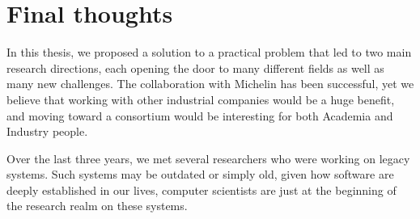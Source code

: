 \section{Final thoughts}
\label{sec:conclusion:final-thoughts}

In this thesis, we proposed a solution to a practical problem
that led to two main research directions, each opening the door
to many different fields as well as many new challenges. The
collaboration with Michelin has been successful, yet we believe
that working with other industrial companies would be a huge
benefit, and moving toward a consortium would be interesting for
both Academia and Industry people.

Over the last three years, we met several researchers who were
working on legacy systems. Such systems may be outdated or simply
old, given how software are deeply established in our lives,
computer scientists are just at the beginning of the research
realm on these systems.
